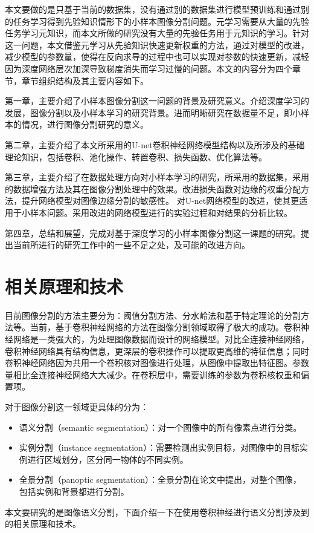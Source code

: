 \documentclass[AutoFakeBold]{LZUThesis}
\begin{document}
本文要做的是只基于当前的数据集，没有通过别的数据集进行模型预训练和通过别的任务学习得到先验知识情形下的小样本图像分割问题。元学习需要从大量的先验任务学习元知识，而本文所做的研究没有大量的先验任务用于元知识的学习。针对这一问题，本文借鉴元学习从先验知识快速更新权重的方法，通过对模型的改进，减少模型的参数量，使得在反向求导的过程中也可以实现对参数的快速更新，减轻因为深度网络层次加深导致梯度消失而学习过慢的问题。
​
本文的内容分为四个章节，章节组织结构及其主要内容如下。

​		第一章，主要介绍了小样本图像分割这一问题的背景及研究意义。介绍深度学习的发展，图像分割以及小样本学习的研究背景。进而明晰研究在数据量不足，即小样本的情况，进行图像分割研究的意义。

​		第二章，主要介绍了本文所采用的U-net卷积神经网络模型结构以及所涉及的基础理论知识，包括卷积、池化操作、转置卷积、损失函数、优化算法等。

​		第三章，主要介绍了在数据处理方向对小样本学习的研究，所采用的数据集，采用的数据增强方法及其在图像分割处理中的效果。改进损失函数对边缘的权重分配方法，提升网络模型对图像边缘分割的敏感性。
对U-net网络模型的改进，使其更适用于小样本问题。采用改进的网络模型进行的实验过程和对结果的分析比较。

​		第四章，总结和展望，完成对基于深度学习的小样本图像分割这一课题的研究。提出当前所进行的研究工作中的一些不足之处，及可能的改进方向。







\chapter{相关原理和技术}



目前图像分割的方法主要分为：阈值分割方法\textsuperscript{\cite{zhang2010ore}}、分水岭法\textsuperscript{\cite{zhang2011segmentation}}和基于特定理论的分割方法\textsuperscript{\cite{yang2014ore}}等。当前，基于卷积神经网络的方法在图像分割领域取得了极大的成功。卷积神经网络是一类强大的，为处理图像数据而设计的网络模型。对比全连接神经网络，卷积神经网络具有结构信息，更深层的卷积操作可以提取更高维的特征信息；同时卷积神经网络因为共用一个卷积核对图像进行处理，从图像中提取出特征图。参数量相比全连接神经网络大大减少。在卷积层中，需要训练的参数为卷积核权重和偏置项。

对于图像分割这一领域更具体的分为：
\begin{itemize}[topsep=5pt]
    \item 语义分割（semantic segmentation）：对一个图像中的所有像素点进行分类。
    \item 实例分割（instance segmentation）：需要检测出实例目标，对图像中的目标实例进行区域划分，区分同一物体的不同实例。
    \item 全景分割（panoptic segmentation）：全景分割在论文\textsuperscript{\cite{kirillov2019panoptic}}中提出，对整个图像，包括实例和背景都进行分割。
\end{itemize}
\par
本文要研究的是图像语义分割，下面介绍一下在使用卷积神经进行语义分割涉及到的相关原理和技术。
\end{document}
